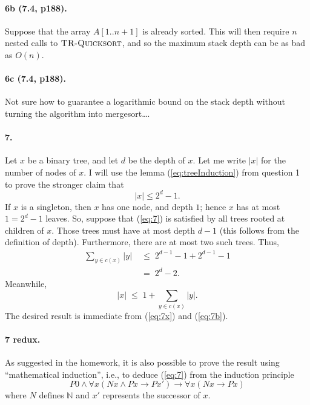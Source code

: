 \documentclass[
]{article}
\begin{document}
\paragraph{6b (7.4, p188).} Suppose that the array $A[1..n+1]$ is already sorted.  This will then require $n$ nested calls to $\textsc{TR-Quicksort}$, and so the maximum stack depth can be as bad as $O(n)$.

\paragraph{6c (7.4, p188).} Not sure how to guarantee a logarithmic bound on the stack depth without turning the algorithm into mergesort\ldots.



\paragraph{7.} Let $x$ be a binary tree, and let $d$ be the depth of $x$.  Let me write $|x|$ for the number of nodes of $x$.  I will use the lemma (\ref{eq:treeInduction}) from question 1 to prove the stronger claim that 
\begin{equation}
  \label{eq:7}
  |x|\leq 2^{d}-1.
\end{equation}
If $x$ is a singleton, then $x$ has one node, and depth $1$; hence $x$ has at most $1=2^d-1$ leaves.  So, suppose that (\ref{eq:7}) is satisfied by all trees rooted at children of $x$. Those trees must have at most depth $d-1$ (this follows from the definition of depth).  Furthermore, there are at most two such trees.
Thus,
\begin{align}
  \label{eq:7x}
\nonumber
  \sum_{y\in c(x)}|y|
  \;&\leq \;
    2^{d-1} - 1 + 2^{d-1} - 1 \\ 
  \;&=\;
    2^d-2.
\end{align}
Meanwhile,
\begin{equation}
  \label{eq:7b}
|x| \;\leq \;
  1 + \sum_{y\in c(x)}|y|.
\end{equation}
The desired result is immediate from (\ref{eq:7x}) and (\ref{eq:7b}).


\paragraph{7 redux.} As suggested in the homework, it is also possible to prove the result using ``mathematical induction'', i.e., to deduce (\ref{eq:7}) from the induction principle
\begin{equation}
  \label{eq:numInduction}
  P0 \land \forall x(Nx \land Px\to Px')\to \forall x(Nx\to Px)
\end{equation}
where $N$ defines $\mathbb N$ and $x'$ represents the successor of $x$.
\end{document}
